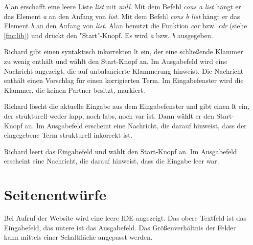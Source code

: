 \documentclass[parskip=full,11pt,twoside]{scrartcl}
\begin{document}
{Alan erschafft eine leere Liste \emph{list} mit \emph{null}. 
 Mit dem Befehl \emph{cons a list} hängt er das Element \emph{a} an den Anfang von \emph{list}.
 Mit dem Befehl \emph{cons b list} hängt er das Element \emph{b} an den Anfang von \emph{list}.
 Alan benutzt die Funktion \emph{car} bzw. \emph{cdr} (siehe \ref{fnc:lib}) und drückt den "Start"-Knopf.}
{Es wird \emph{a} bzw. \emph{b} ausgegeben.}


{Richard gibt einen syntaktisch inkorrekten \gls{lt} ein, der eine schließende Klammer
zu wenig enthält und wählt den Start-Knopf an.}
{Im Ausgabefeld wird eine Nachricht angezeigt, die auf unbalancierte Klammerung hinweist.
Die Nachricht enthält einen Vorschlag für einen korrigierten Term. Im Eingabefenster wird
die Klammer, die keinen Partner besitzt, markiert.}

{Richard löscht die aktuelle Eingabe aus dem Eingabefenster und gibt einen \gls{lt} ein, der strukturell weder \gls{lapp}, noch
\gls{labs}, noch \gls{var} ist. Dann wählt er den Start-Knopf an.}
{Im Ausgabefeld erscheint eine Nachricht, die darauf hinweist, dass der eingegebene
Term strukturell inkorrekt ist.}

{Richard leert das Eingabefeld und wählt den Start-Knopf an.}
{Im Ausgabefeld erscheint eine Nachricht, die darauf hinweist, dass die Eingabe leer war.}
%
%
%

\pagebreak
\appendix

\section{Seitenentwürfe}


Bei Aufruf der Website wird eine leere IDE angezeigt. Das obere Textfeld ist das Eingabefeld, das untere ist das Ausgabefeld. Das Größenverhältnis der Felder kann mittels einer Schaltfläche angepasst werden.
\end{document}
